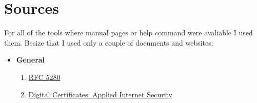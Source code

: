 \documentclass[10pt, a4paper]{report}
\begin{document}
\chapter{Sources}
For all of the tools where manual pages or help command were avaliable I used them. Besize that I used only a couple of documents and websites: 
\begin{itemize}
 \item \textbf{General} 
   \begin{enumerate}
    \item \href{https://tools.ietf.org/rfc/rfc5280.txt}{RFC 5280}
    \item \href{https://books.google.cz/books/about/Digital_Certificates.html?id=0_3XAAAAMAAJ}{Digital Certificates: Applied Internet Security}
   \end{enumerate}


\end{itemize}
\end{document}
